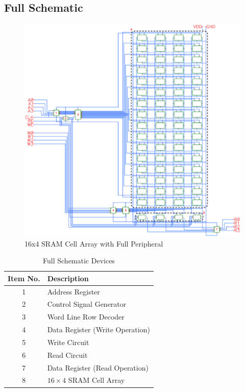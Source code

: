 \documentclass[10pt,letterpaper,onecolumn]{article}
\begin{document}
\subsection{Full Schematic}
\begin{figure}[h!]
\centering
\includegraphics[clip,width=0.9\columnwidth]{Full_Schematic.png}
\caption{16x4 SRAM Cell Array with Full Peripheral}
\label{fig:Full_Schematic}
\end{figure}

\begin{table}[h!]
\centering
\begin{tabular}{ |c|l| }
  \hline
  \textbf{Item No.} & \textbf{Description} \\ 
  \hline
  1 & Address Register \\  
  \hline
  2 & Control Signal Generator \\
  \hline
  3 & Word Line Row Decoder \\
  \hline
  4 & Data Register (Write Operation) \\
  \hline
  5 & Write Circuit \\  
  \hline
  6 & Read Circuit \\
  \hline
  7 & Data Register (Read Operation) \\
  \hline
  8 & $16\times4$ SRAM Cell Array \\
  \hline
\end{tabular}
\caption{Full Schematic Devices}
\label{table:Full_Decives}
\end{table}
\end{document}
